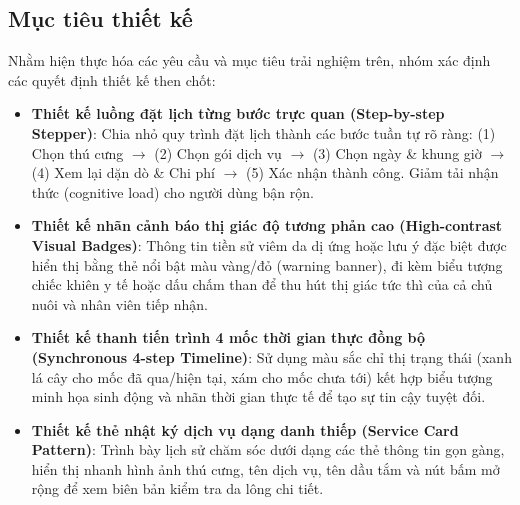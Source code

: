 \subsection{Mục tiêu thiết kế}
Nhằm hiện thực hóa các yêu cầu và mục tiêu trải nghiệm trên, nhóm xác định các quyết định thiết kế then chốt:
\begin{itemize}
    \item \textbf{Thiết kế luồng đặt lịch từng bước trực quan (Step-by-step Stepper)}: Chia nhỏ quy trình đặt lịch thành các bước tuần tự rõ ràng: (1) Chọn thú cưng $\rightarrow$ (2) Chọn gói dịch vụ $\rightarrow$ (3) Chọn ngày \& khung giờ $\rightarrow$ (4) Xem lại dặn dò \& Chi phí $\rightarrow$ (5) Xác nhận thành công. Giảm tải nhận thức (cognitive load) cho người dùng bận rộn.
    \item \textbf{Thiết kế nhãn cảnh báo thị giác độ tương phản cao (High-contrast Visual Badges)}: Thông tin tiền sử viêm da dị ứng hoặc lưu ý đặc biệt được hiển thị bằng thẻ nổi bật màu vàng/đỏ (warning banner), đi kèm biểu tượng chiếc khiên y tế hoặc dấu chấm than để thu hút thị giác tức thì của cả chủ nuôi và nhân viên tiếp nhận.
    \item \textbf{Thiết kế thanh tiến trình 4 mốc thời gian thực đồng bộ (Synchronous 4-step Timeline)}: Sử dụng màu sắc chỉ thị trạng thái (xanh lá cây cho mốc đã qua/hiện tại, xám cho mốc chưa tới) kết hợp biểu tượng minh họa sinh động và nhãn thời gian thực tế để tạo sự tin cậy tuyệt đối.
    \item \textbf{Thiết kế thẻ nhật ký dịch vụ dạng danh thiếp (Service Card Pattern)}: Trình bày lịch sử chăm sóc dưới dạng các thẻ thông tin gọn gàng, hiển thị nhanh hình ảnh thú cưng, tên dịch vụ, tên dầu tắm và nút bấm mở rộng để xem biên bản kiểm tra da lông chi tiết.
\end{itemize}
